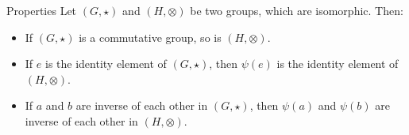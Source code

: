 \documentclass[a4paper]{article}
\begin{document}
\begin{parag}{Properties}
    Let $\left(G, \star\right)$ and $\left(H, \otimes\right)$ be two groups, which are isomorphic. Then:
    \begin{itemize}
        \item If $\left(G, \star\right)$ is a commutative group, so is $\left(H, \otimes\right)$.
        \item If $e$ is the identity element of $\left(G, \star\right)$, then $\psi\left(e\right)$ is the identity element of $\left(H, \otimes\right)$.
        \item If $a$ and $b$ are inverse of each other in $\left(G, \star\right)$, then $\psi\left(a\right)$ and $\psi\left(b\right)$ are inverse of each other in $\left(H, \otimes\right)$.
    \end{itemize}
\end{parag}
\end{document}
